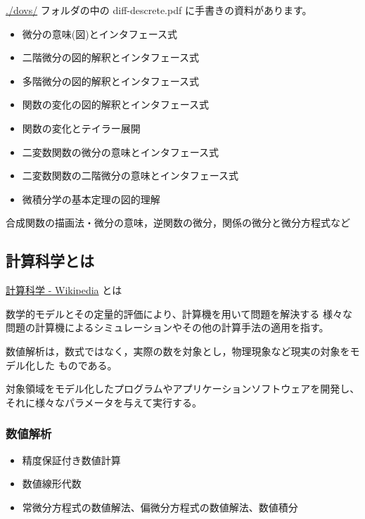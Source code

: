\documentclass[dvipdfmx,11pat]{jarticle}
\begin{document}
\url{./dovs/} フォルダの中の diff-descrete.pdf に手書きの資料があります。

\begin{itemize}
\item 微分の意味(図)とインタフェース式
\item 二階微分の図的解釈とインタフェース式
\item 多階微分の図的解釈とインタフェース式
\item 関数の変化の図的解釈とインタフェース式
\item 関数の変化とテイラー展開
\item 二変数関数の微分の意味とインタフェース式
\item 二変数関数の二階微分の意味とインタフェース式
\item 微積分学の基本定理の図的理解
\end{itemize}

合成関数の描画法・微分の意味，逆関数の微分，関係の微分と微分方程式など
\subsection{計算科学とは}
\label{sec:org7c2279d}

\href{https://ja.wikipedia.org/wiki/\%E8\%A8\%88\%E7\%AE\%97\%E7\%A7\%91\%E5\%AD\%A6}{計算科学 - Wikipedia} とは

数学的モデルとその定量的評価により、計算機を用いて問題を解決する
様々な問題の計算機によるシミュレーションやその他の計算手法の適用を指す。


数値解析は，数式ではなく，実際の数を対象とし，物理現象など現実の対象をモデル化した
ものである。

対象領域をモデル化したプログラムやアプリケーションソフトウェアを開発し、
それに様々なパラメータを与えて実行する。
\subsubsection{数値解析}
\label{sec:org893b5e7}
\begin{itemize}
\item 精度保証付き数値計算
\item 数値線形代数
\item 常微分方程式の数値解法、偏微分方程式の数値解法、数値積分
\end{itemize}
\end{document}
